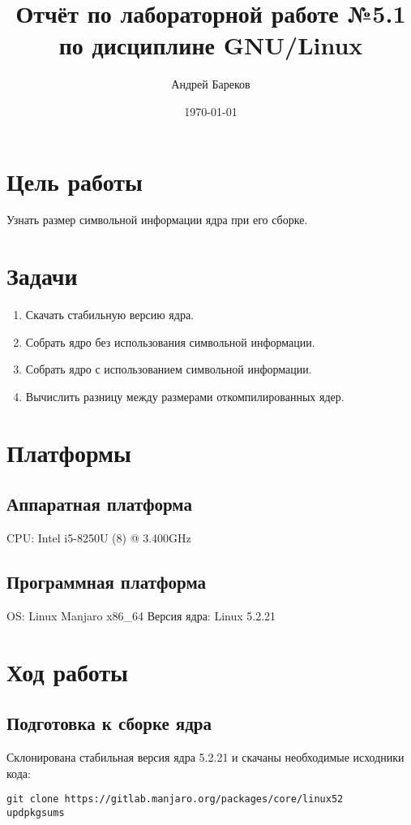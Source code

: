 \documentclass[a4paper,11pt]{article}
\title{Отчёт по лабораторной работе №5.1 по дисциплине GNU/Linux}
\author{Андрей Бареков}
\date{\today}
\begin{document}
\maketitle
\newpage

\section{Цель работы}
  Узнать размер символьной информации ядра при его сборке.

\section{Задачи}
  \begin{enumerate}
    \item Скачать стабильную версию ядра.
    \item Собрать ядро без использования символьной информации.
    \item Собрать ядро с использованием символьной информации.
    \item Вычислить разницу между размерами откомпилированных ядер.
  \end{enumerate}

\section{Платформы}
  \subsection{Аппаратная платформа}
    CPU: Intel i5-8250U (8) @ 3.400GHz

  \subsection{Программная платформа}
    OS: Linux Manjaro x86\_64
    Версия ядра: Linux 5.2.21

\newpage
\section{Ход работы}
  \subsection{Подготовка к сборке ядра}
    \lstset{style=mycode}

    Склонирована стабильная версия ядра 5.2.21 и скачаны необходимые исходники кода:
    \begin{lstlisting}
git clone https://gitlab.manjaro.org/packages/core/linux52
updpkgsums
    \end{lstlisting}
\end{document}
